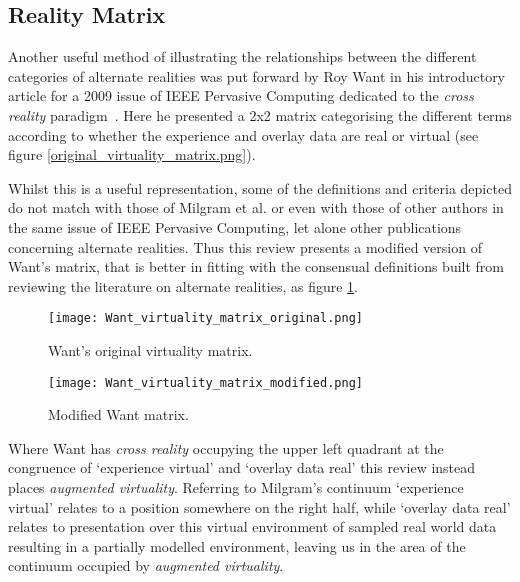 


\clearpage

\subsection{Reality Matrix}
\label{subsec:reality_matrix}
Another useful method of illustrating the relationships between the different categories of alternate realities was put forward by Roy Want in his introductory article for a 2009 issue of IEEE Pervasive Computing dedicated to the \textit{cross reality} paradigm~\cite{Want2009}. Here he presented a 2x2 matrix categorising the different terms according to whether the experience and overlay data are real or virtual (see figure \ref{original_virtuality_matrix.png}).

Whilst this is a useful representation, some of the definitions and criteria depicted do not match with those of Milgram et al. or even with those of other authors in the same issue of IEEE Pervasive Computing, let alone other publications concerning alternate realities. Thus this review presents a modified version of Want's matrix, that is better in fitting with the consensual definitions built from reviewing the literature on alternate realities, as figure \ref{modified_virtuality_matrix.png}.

\begin{figure}
\centering
\begin{minipage}{.5\textwidth}
 	\centering
 	\texttt{[image: Want\_virtuality\_matrix\_original.png]}
 	\caption{Want's original virtuality matrix.}
	\label{original_virtuality_matrix.png}
\end{minipage}%
\begin{minipage}{.5\textwidth}
  \centering
  \texttt{[image: Want\_virtuality\_matrix\_modified.png]}
    \caption{Modified Want matrix.}
    \label{modified_virtuality_matrix.png}
\end{minipage}
\end{figure}

Where Want has \textit{cross reality} occupying the upper left quadrant at the congruence of `experience virtual' and `overlay data real' this review instead places \textit{augmented virtuality}. Referring to Milgram's continuum `experience virtual' relates to a position somewhere on the right half, while `overlay data real' relates to presentation over this virtual environment of sampled real world data resulting in a partially modelled environment, leaving us in the area of the continuum occupied by \textit{augmented virtuality}.

